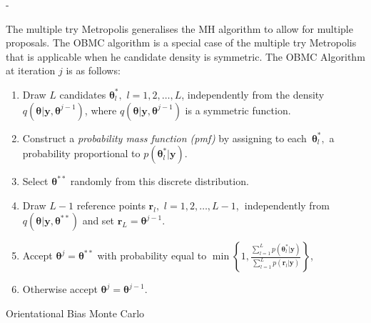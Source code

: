 -\documentclass[article]{jss}
\begin{document}
The multiple try Metropolis \citep{LuiLiangWong2000} generalises the
MH algorithm to allow for multiple proposals. The OBMC algorithm is a
special case of the multiple try Metropolis that is applicable when he
candidate density is symmetric. The OBMC Algorithm at iteration $j$ is
as follows:

%
\begin{algorithm}[H]
\begin{enumerate}
\item Draw $L$ candidates $\bm{\theta}_{l}^{\ast},$ $l=1,2,\ldots,L$,
  independently from the density
  $q\left(\bm{\theta}|\bm{y},\bm{\theta}^{j-1}\right)$, where
  $q\left(\bm{\theta}|\bm{y},\bm{\theta}^{j-1}\right)$ is a symmetric
  function.
\item Construct a \textit{probability mass function (pmf)} by
  assigning to each\emph{\ }$\bm{\theta}_{l}^{\ast},$ a probability
  proportional to $p\left(\bm{\theta}_{l}^{\ast}|\bm{y}\right).$
\item Select $\bm{\theta}^{\ast\ast}$ randomly from this discrete
  distribution.
\item Draw $L-1$ reference points $\bm{r}_{l},$
  $l=1,2,\ldots,L-1$,\textbf{\ }independently from
  $q\left(\bm{\theta}|\bm{y},\bm{\theta}^{\ast\ast}\right)$ and set
  $\bm{r}_{L}=\bm{\theta}^{j-1}.$
\item Accept $\bm{\theta}^{j}=\bm{\theta}^{\ast\ast}$ with probability
  equal to $\min\left\{
    1,\frac{\sum_{l=1}^{L}p\left(\bm{\theta}_{l}^{\ast}|\bm{y}\right)}{\sum_{l=1}^{L}p\left(\bm{r}_{l}|\bm{y}\right)}\right\}
  $,
\item Otherwise accept $\bm{\theta}^{j}=\bm{\theta}^{j-1}.$
\end{enumerate}
\caption{Orientational Bias Monte Carlo}
\label{alg:obmc}
\end{algorithm}
\end{document}
